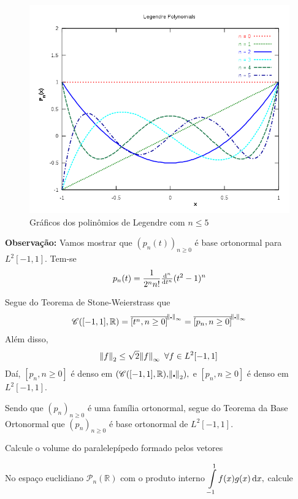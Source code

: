 \documentclass[11pt,a4paper]{article}
\begin{document}
{ \begin{figure}
     \includegraphics[scale=0.6]{figuras/legendre.png}
     \caption{Gráficos dos polinômios de Legendre com $n \le 5$}
 \end{figure}



 \textbf{Observação:} Vamos mostrar que $(p_n(t))_{n \ge 0}$ é base ortonormal para $L^2[-1,1].$ Tem-se
 \[
 p_n(t) = \frac{1}{2^n n!} \od[n]{}{t} (t^2 - 1)^n
 \]
 
 Segue do Teorema de Stone-Weierstrass que
 \[
 \mathcal{C}([-1,1], \mathbb{R}) = \overline{[t^n, n \ge 0 ]}^{\norm{\centerdot}_\infty} = \overline{[p_n , n \ge 0]}^{\norm{\centerdot}_\infty}
 \]
 Além disso,
 \[
 \norm{f}_2 \le \sqrt{2} \norm{f}_\infty \ \forall f \in L^2[-1,1] 
 \]
 Daí, $[p_n, n \ge 0]$ é denso em $(\mathcal{C}([-1,1], \mathbb{R}), \norm{\centerdot}_2),$ e $[p_n, n \ge 0]$ é denso em $L^2[-1,1].$
 
 Sendo que $(p_n)_{n \ge 0}$ é uma família ortonormal, segue do Teorema da Base Ortonormal que $(p_n)_{n \ge 0}$ é base ortonormal de $L^2[-1,1].$

}

 Calcule o volume do paralelepípedo formado pelos vetores

\solucao{}
 No espaço euclidiano $\mathcal{P}_n(\mathbb{R})$ com o produto interno $\displaystyle\int\limits_{-1}^1 f(x)g(x) \dif x,$ calcule
\solucao{
}
\end{document}
